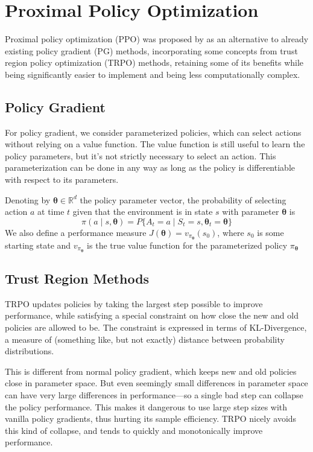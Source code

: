 \chapter{Proximal Policy Optimization}
Proximal policy optimization (PPO) was proposed by \cite{https://doi.org/10.48550/arxiv.1707.06347} as an alternative to already existing policy gradient (PG) methods, incorporating some concepts from trust region policy optimization (TRPO) methods, retaining some of its benefits while being significantly easier to implement and being less computationally complex.
\section{Policy Gradient}
For policy gradient, we consider parameterized policies, which can select actions without relying on a value function. The value function is still useful to learn the policy parameters, but it's not strictly necessary to select an action. This parameterization can be done in any way as long as the policy is differentiable with respect to its parameters.

Denoting by $\boldsymbol\theta \in \mathbb{R}^d$ the policy parameter vector, the probability of selecting action $a$ at time $t$ given that the environment is in state $s$ with parameter $\boldsymbol\theta$ is
\[
    \pi(a \mid s, \boldsymbol\theta) = P\{A_t = a \mid S_t = s, \boldsymbol\theta_t = \boldsymbol\theta\}   
\]
We also define a performance measure $J(\boldsymbol\theta) = v_{\pi_{\boldsymbol\theta}}(s_0)$, where $s_0$ is some starting state and $v_{\pi_{\boldsymbol\theta}}$ is the true value function for the parameterized policy $\pi_{\boldsymbol\theta}$

\section{Trust Region Methods}
TRPO updates policies by taking the largest step possible to improve performance, while satisfying a special constraint on how close the new and old policies are allowed to be. The constraint is expressed in terms of KL-Divergence, a measure of (something like, but not exactly) distance between probability distributions.

This is different from normal policy gradient, which keeps new and old policies close in parameter space. But even seemingly small differences in parameter space can have very large differences in performance—so a single bad step can collapse the policy performance. This makes it dangerous to use large step sizes with vanilla policy gradients, thus hurting its sample efficiency. TRPO nicely avoids this kind of collapse, and tends to quickly and monotonically improve performance.
